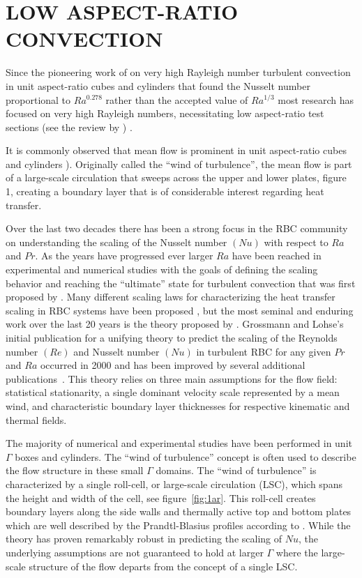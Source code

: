 \documentclass[twocolumn,10pt]{tsfp}
\begin{document}
\section*{LOW ASPECT-RATIO CONVECTION}

Since the pioneering work of \cite{castaing1989scaling} on very high Rayleigh  number turbulent convection in unit aspect-ratio cubes and cylinders that found the Nusselt number proportional to $Ra^{0.278}$ rather than the accepted value of $Ra^{1/3}$ most research has focused on very high Rayleigh numbers, necessitating low aspect-ratio test sections (see the review by \cite{ahlers2009heat}) . 

It is commonly observed that mean flow is prominent in unit aspect-ratio cubes and cylinders \citep{zocchi1990coherent, bodenschatz2000recent,ahlers2009heat}). 
Originally called the ``wind of turbulence'', the mean flow is part of a large-scale circulation that sweeps across the upper and lower plates, figure 1, creating a boundary layer that is of considerable interest regarding heat transfer.

Over the last two decades there has been a strong focus in the RBC community on understanding the scaling of the Nusselt number $(Nu)$ with respect to $Ra$ and $Pr$.  
As the years have progressed ever larger $Ra$ have been reached in experimental and numerical studies with the goals of defining the scaling behavior and reaching the ``ultimate'' state for turbulent convection that was first proposed by \cite{kraichnan1962turbulent}.  
Many different scaling laws for characterizing the heat transfer scaling in RBC systems have been proposed \citep{ahlers2009heat} , but the most seminal and enduring work over the last 20 years is the theory proposed by \cite{grossmann2000scaling}.   
Grossmann and Lohse's initial publication for a unifying theory to predict the scaling of the Reynolds number $(Re)$ and Nusselt number $(Nu)$ in turbulent RBC for any given $Pr$ and $Ra$ occurred in 2000 and has been improved by several additional publications~\citep{grossmann2001thermal,grossmann2002prandtl,grossmann2003geometry,grossmann2004fluctuations,stevens2013unifying}.  
This theory relies on three main assumptions for the flow field: statistical stationarity, a single dominant velocity scale represented by a mean wind, and characteristic boundary layer thicknesses for respective kinematic and thermal fields. 
  
The majority of numerical and experimental studies have been performed in unit $\Gamma$ boxes and cylinders.  The ``wind of turbulence'' concept is often used to describe the flow structure in these small $\Gamma$ domains.  
The ``wind of turbulence'' is characterized by a single roll-cell, or large-scale circulation (LSC), which spans the height and width of the cell, see figure~\ref{fig:1ar}.  This roll-cell creates boundary layers along the side walls and thermally active top and bottom plates which are well described by the Prandtl-Blasius profiles according to \cite{grossmann2000scaling}.  
While the theory has proven remarkably robust in predicting the scaling of $Nu$, the underlying assumptions are not guaranteed to hold at larger $\Gamma$ where the large-scale structure of the flow departs from the concept of a single LSC.
\end{document}
